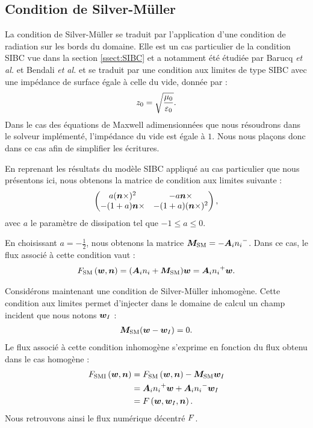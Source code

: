 
\subsection{Condition de Silver-Müller}
\label{ssect:silver_mueller}


La condition de Silver-Müller se traduit par l’application d’une condition
de radiation sur les bords du domaine.
Elle est un cas particulier de la condition
SIBC vue dans la section \ref{ssect:SIBC}
et a notamment été étudiée par Barucq \textit{et al.} \cite{barucq:hal-00925603}
et Bendali \textit{et al.} \cite{Bendali} et se traduit par une condition
aux limites de type SIBC avec une impédance de surface égale à celle du
vide, donnée par :
\begin{align}
	z_0 = \sqrt{\frac{\mu_0}{\varepsilon_0}} .
\end{align}
Dans le cas des équations de Maxwell adimensionnées que nous
résoudrons dans le solveur implémenté,
l'impédance du vide est égale à $1$. Nous nous plaçons donc
dans ce cas afin de simplifier les écritures. 

En reprenant les résultats du modèle SIBC appliqué au cas particulier
que nous présentons ici, nous obtenons la matrice de condition
aux limites suivante :
\begin{align}
	\begin{pmatrix}
		a (\bm{n} \times)^2 & - a \bm{n} \times \\
		- (1 + a) \bm{n} \times & - (1 + a) (\bm{n} \times)^2
	\end{pmatrix} ,
\end{align}
avec $a$ le paramètre de dissipation tel que $-1 \le a \le 0$.

En choisissant $a = - \frac{1}{2}$, nous obtenons la matrice
$\bm{M}_{\mathrm{SM}} = - {\bm{A}_{i}n_{i}}^{-}$.
Dans ce cas, le flux associé à cette condition vaut :
\begin{align}
	F_\mathrm{SM}\left(\bm{w},\bm{n}\right) = ({\bm{A}_{i}n_{i}} + \bm{M}_{\mathrm{SM}}) \bm{w}
	= {\bm{A}_{i}n_{i}}^{+} \bm{w} .
\end{align}

Considérons maintenant une condition de Silver-Müller inhomogène.
Cette condition aux limites permet d’injecter dans le domaine
de calcul un champ incident que nous notons $\bm{w}_I$ :
\begin{align}
	\bm{M}_{\mathrm{SM}} (\bm{w} - \bm{w}_I) = 0 .
\end{align}
Le flux associé à cette condition inhomogène s’exprime en fonction
du flux obtenu dans le cas homogène :
\begin{equation}
	\begin{aligned}
		F_\mathrm{SMI}\left(\bm{w},\bm{n}\right) &= F_\mathrm{SM}\left(\bm{w},\bm{n}\right) - \bm{M}_{\mathrm{SM}} \bm{w}_I \\
		&= {\bm{A}_{i}n_{i}}^{+} \bm{w} + {\bm{A}_{i}n_{i}}^{-} \bm{w}_I \\
		&= F\left(\bm{w},\bm{w}_I,\bm{n}\right) .
	\end{aligned}
\end{equation}
Nous retrouvons ainsi le flux numérique décentré $F$.
\\



